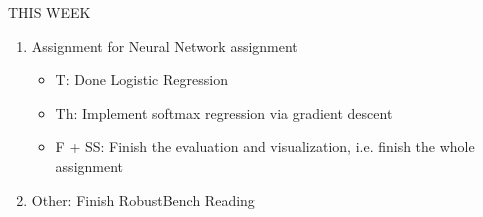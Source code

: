\begin{frame}{THIS WEEK}
    \begin{enumerate}
        \item Assignment for Neural Network assignment
        \begin{itemize}
            \item T: Done Logistic Regression
            \item Th: Implement softmax regression via gradient descent
            \item F + SS: Finish the evaluation and visualization, i.e. finish the whole assignment
        \end{itemize}
        \item Other: Finish RobustBench Reading
    \end{enumerate}
\end{frame}



